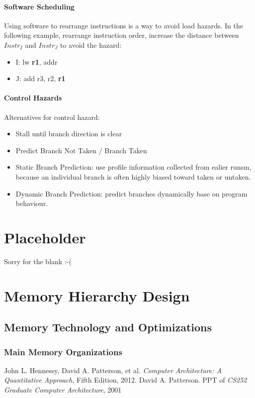 \documentclass[12pt, a4paper]{article}
\theoremstyle{margin}
\begin{document}
      \paragraph{Software Scheduling}
      Using software to rearrange instructions is a way to avoid load hazards. In the following example, rearrange instruction order, increase the distance between $Instr_I$ and $Instr_J$ to avoid the hazard:\\
      \begin{itemize}
        \item I: lw \textbf{r1}, addr
        \item J: add r3, r2, \textbf{r1}
      \end{itemize}

      \paragraph{Control Hazards} Alternatives for control hazard\cite{caqa}:
      \begin{itemize}
        \item Stall until branch direction is clear
        \item Predict Branch Not Taken / Branch Taken
        \item Static Branch Prediction: 
        use profile information collected from ealier runsm, because an individual branch is often highly biased toward taken or untaken.
        \item Dynamic Branch Prediction: 
        predict branches dynamically base on  program behaviour.
      \end{itemize}

\section{Placeholder}
Sorry for the blank :-(

\section{Memory Hierarchy Design}
  \subsection{Memory Technology and Optimizations}
  	\subsubsection{Main Memory Organizations}
  		


\begin{thebibliography}{9}
    John L. Hennessy, David A. Patterson, et al.
    \emph{Computer Architecture: A Quantitative Approach},
    Fifth Edition, 2012.
    David A. Patterson.
    PPT of \emph{CS252 Graduate Computer Architecture},
    2001
\end{thebibliography}
\end{document}
